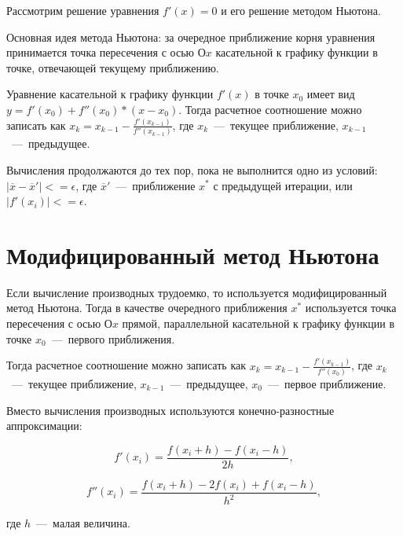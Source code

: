 Рассмотрим решение уравнения $f'(x) = 0$ и его решение методом Ньютона.

Основная идея метода Ньютона: за очередное приближение корня уравнения принимается точка пересечения с осью $Оx$ касательной к графику функции в точке, отвечающей текущему приближению.

Уравнение касательной к графику функции $f'(x)$ в точке $x_0$ имеет вид $y = f'(x_0) + f''(x_0) * (x - x_0)$.
Тогда расчетное соотношение можно записать как $x_k = x_{k-1} - \frac{f'(x_{k-1})}{f''(x_{k-1})}$, где $x_k$~---~текущее приближение, $x_{k-1}$~---~предыдущее.

Вычисления продолжаются до тех пор, пока не выполнится одно из условий: $|\overline{x} - \overline{x}'| <= \epsilon$, где $\overline{x}'$~---~приближение $x^{*}$ с предыдущей итерации, или $|f'(x_i)| <= \epsilon$.

\section{Модифицированный метод Ньютона}

Если вычисление производных трудоемко, то используется модифицированный метод Ньютона. Тогда в качестве очередного приближения $x^{*}$ используется точка пересечения с осью $Оx$ прямой, параллельной касательной к графику функции в точке $x_0$~---~первого приближения.

Тогда расчетное соотношение можно записать как $x_k = x_{k-1} - \frac{f'(x_{k-1})}{f''(x_0)}$, где $x_k$~---~текущее приближение, $x_{k-1}$~---~предыдущее, $x_0$~---~первое приближение.

Вместо вычисления производных используются конечно-разностные аппроксимации:

\begin{equation*}
 f'(x_i) = \frac{f(x_i + h) - f(x_i - h)}{2h},
\end{equation*}

\begin{equation*}
 f''(x_i) = \frac{f(x_i + h) - 2f(x_i) + f(x_i - h)}{h^2},
\end{equation*}

где $h$~---~малая величина.


